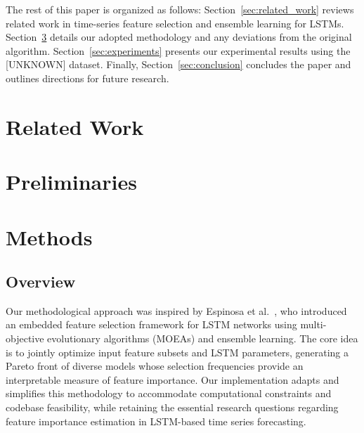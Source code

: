 \documentclass[12pt]{article}
\begin{document}
The rest of this paper is organized as follows: Section~\ref{sec:related_work} reviews related work in time-series feature selection and ensemble learning for LSTMs. Section~\ref{sec:methods} details our adopted methodology and any deviations from the original algorithm. Section~\ref{sec:experiments} presents our experimental results using the [UNKNOWN] dataset. Finally, Section~\ref{sec:conclusion} concludes the paper and outlines directions for future research.



\section{Related Work}

\section{Preliminaries}

 
\section{Methods}
\label{sec:methods}

\subsection{Overview}

Our methodological approach was inspired by Espinosa et al.~\cite{espinosa2023efs}, who introduced an embedded feature selection framework for LSTM networks using multi-objective evolutionary algorithms (MOEAs) and ensemble learning. The core idea is to jointly optimize input feature subsets and LSTM parameters, generating a Pareto front of diverse models whose selection frequencies provide an interpretable measure of feature importance. Our implementation adapts and simplifies this methodology to accommodate computational constraints and codebase feasibility, while retaining the essential research questions regarding feature importance estimation in LSTM-based time series forecasting.
\end{document}
